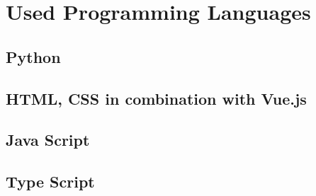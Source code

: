 
\chapter{Used Programming Languages}
\label{chap:used_programming_languages}


\section{Python}

\section{HTML, CSS in combination with Vue.js}

\section{Java Script}

\section{Type Script}

